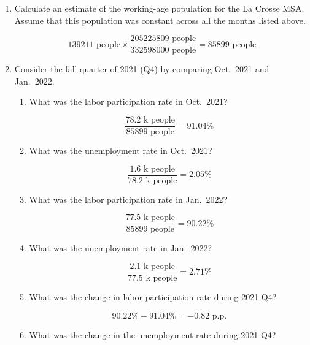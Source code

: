 \documentclass{assignment}
\begin{document}
\begin{enumerate}

\item Calculate an estimate of the working-age population for the La Crosse MSA. Assume that this population was constant across all the months listed above.

\begin{solution}
$$139211 \text{~people} \times \frac{205225809\text{~people}}{332598000\text{~people}}=85899\text{~people}$$
\end{solution}

\item Consider the fall quarter of 2021 (Q4) by comparing Oct.~2021 and Jan.~2022.

\begin{enumerate}
\item What was the labor participation rate in Oct.~2021?

\begin{solution}
$$\frac{78.2 \text{~k people}}{85899 \text{~people}} = 91.04\%$$
\end{solution}

\item What was the unemployment rate in Oct.~2021?

\begin{solution}
$$\frac{1.6 \text{~k people}}{78.2 \text{~k people}} = 2.05\%$$
\end{solution}

\item What was the labor participation rate in Jan.~2022?

\begin{solution}
$$\frac{77.5 \text{~k people}}{85899 \text{~people}} = 90.22\%$$
\end{solution}

\item What was the unemployment rate in Jan.~2022?

\begin{solution}
$$\frac{2.1 \text{~k people}}{77.5 \text{~k people}} = 2.71\%$$
\end{solution}

\item What was the change in labor participation rate during 2021 Q4?

\begin{solution}
$$90.22\% - 91.04\% = -0.82 \text{~p.p.}$$
\end{solution}

\item What was the change in the unemployment rate during 2021 Q4?


\end{enumerate}
\end{enumerate}
\end{document}
